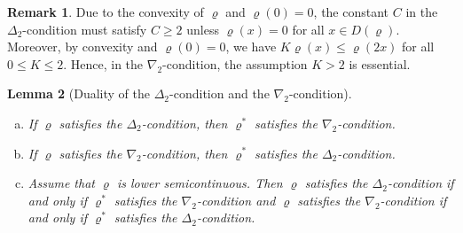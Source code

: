 \documentclass[a4paper,11pt,reqno]{amsart}
\newtheorem{lemma}{Lemma}[section]
\theoremstyle{definition}
\newtheorem{remark}[lemma]{Remark}
\numberwithin{equation}{section}
\newcommand{\vr}{{\varrho}}
\newcommand{\1}{\mathds{1}}
\begin{document}
\begin{remark}
 Due to the convexity of $\vr$ and $\vr(0) = 0$, the constant $C$ in the $\Delta_2$-condition must satisfy $C \geq 2$ unless $\vr(x) =  0$ for all $x \in D(\vr)$. Moreover, by convexity and $\vr(0) = 0$, we have $K\vr(x) \leq \vr(2x)$ for all $0 \leq K \leq 2$. Hence, in the $\nabla_2$-condition, the assumption $K  > 2$ is essential.    
\end{remark}
 

 
 
 \begin{lemma}[Duality of the $\Delta_2$-condition and the $\nabla_2$-condition]\label{lemma:duality delta and nabla}
 \begin{enumerate}[(a)]
  \item   If $\vr$ satisfies the $\Delta_2$-condition, then $\vr^*$ satisfies the $\nabla_2$-condition.  
  \item If $\vr$ satisfies the $\nabla_2$-condition, then $\vr^*$ satisfies the $\Delta_2$-condition. 
  \item Assume that $\vr$ is lower semicontinuous. Then  $\vr$ satisfies the $\Delta_2$-condition if and only if $\vr^*$ satisfies the $\nabla_2$-condition and $\vr$ satisfies the $\nabla_2$-condition if and only if $\vr^*$ satisfies the $\Delta_2$-condition. 
 \end{enumerate}

 \end{lemma}
\end{document}
